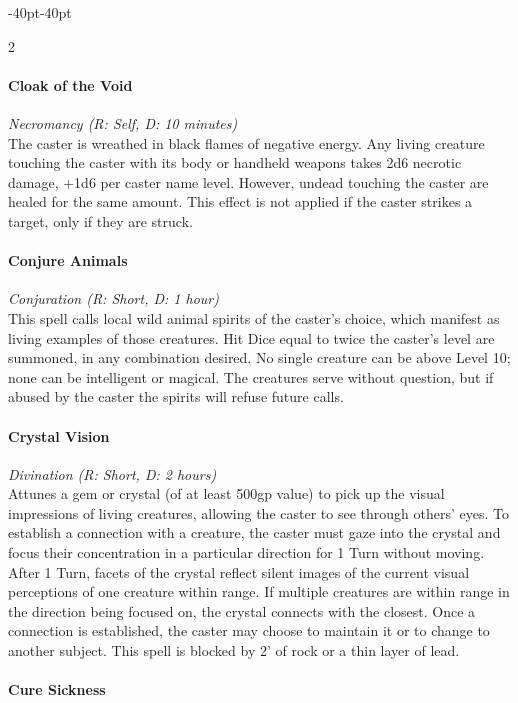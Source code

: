 \documentclass{book}
\begin{document}
\begin{adjustwidth}{-40pt}{-40pt}
\begin{multicols}{2}
\paragraph{Cloak of the Void}\label{cloak-of-the-void}

\emph{Necromancy (R: Self, D: 10 minutes)}\\
The caster is wreathed in black flames of negative energy. Any living
creature touching the caster with its body or handheld weapons takes 2d6
necrotic damage, +1d6 per caster name level. However, undead touching
the caster are healed for the same amount. This effect is not applied if
the caster strikes a target, only if they are struck.

\paragraph{Conjure Animals}\label{conjure-animals}

\emph{Conjuration (R: Short, D: 1 hour)}\\
This spell calls local wild animal spirits of the caster's choice, which
manifest as living examples of those creatures. Hit Dice equal to twice
the caster's level are summoned, in any combination desired. No single
creature can be above Level 10; none can be intelligent or magical. The
creatures serve without question, but if abused by the caster the
spirits will refuse future calls.

\paragraph{Crystal Vision}\label{crystal-vision}

\emph{Divination (R: Short, D: 2 hours)}\\
Attunes a gem or crystal (of at least 500gp value) to pick up the visual
impressions of living creatures, allowing the caster to see through
others' eyes. To establish a connection with a creature, the caster must
gaze into the crystal and focus their concentration in a particular
direction for 1 Turn without moving. After 1 Turn, facets of the crystal
reflect silent images of the current visual perceptions of one creature
within range. If multiple creatures are within range in the direction
being focused on, the crystal connects with the closest. Once a
connection is established, the caster may choose to maintain it or to
change to another subject. This spell is blocked by 2' of rock or a thin
layer of lead.

\paragraph{Cure Sickness}\label{cure-sickness}


\end{multicols}
\end{adjustwidth}
\end{document}
